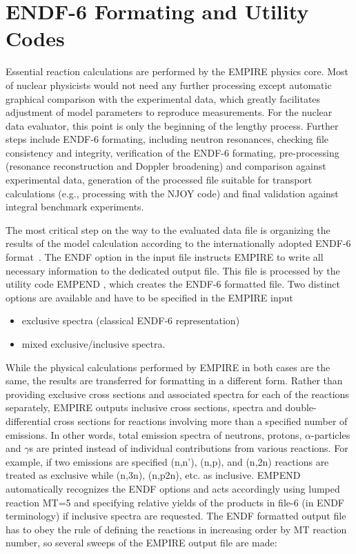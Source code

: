 \section{ENDF-6 Formating and Utility Codes\label{Sec:utility-codes}}

Essential reaction calculations are performed by the EMPIRE physics core.
Most of nuclear physicists would not need any further processing except
automatic graphical comparison with the experimental data, which greatly
facilitates adjustment of model parameters to reproduce measurements. For
the nuclear data evaluator, this point is only the beginning of the lengthy
process. Further steps include ENDF-6 formating, including neutron
resonances, checking file consistency and integrity, verification of the
ENDF-6 formating, pre-processing (resonance reconstruction and Doppler
broadening) and comparison against experimental data, generation of the
processed file suitable for transport calculations (e.g., processing with
the NJOY code) and final validation against integral benchmark experiments.

The most critical step on the way to the evaluated data file is organizing
the results of the model calculation according to the internationally
adopted ENDF-6 format~\cite{Herman:05a}. The ENDF option in the input file
instructs EMPIRE to write all necessary information to the dedicated output
file. This file is processed by the utility code EMPEND%
, which creates the ENDF-6 formatted file. Two distinct
options are available and have to be specified in the EMPIRE input

\begin{itemize}
\item exclusive spectra (classical ENDF-6 representation)

\item mixed exclusive/inclusive spectra.
\end{itemize}

While the physical calculations performed by EMPIRE in both cases are the
same, the results are transferred for formatting in a different form. Rather
than providing exclusive cross sections and associated spectra for each of
the reactions separately, EMPIRE outputs inclusive cross sections, spectra
and double-differential cross sections for reactions involving more than a
specified number of emissions. In other words, total emission spectra of
neutrons, protons, $\alpha$-particles and $\gamma$s are printed instead of
individual contributions from various reactions. For example, if two
emissions are specified (n,n'), (n,p), and (n,2n) reactions are treated as
exclusive while (n,3n), (n,p2n), etc. as inclusive. EMPEND automatically
recognizes the ENDF options and acts accordingly using lumped reaction MT=5
and specifying relative yields of the products in file-6 (in ENDF
terminology) if inclusive spectra are requested. The ENDF formatted output
file has to obey the rule of defining the reactions in increasing order by
MT reaction number, so several sweeps of the EMPIRE output file are made:

